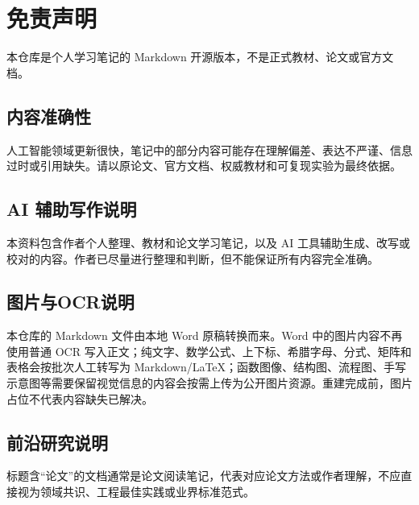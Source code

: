 \hypertarget{ux514dux8d23ux58f0ux660e}{%
\chapter{免责声明}\label{ux514dux8d23ux58f0ux660e}}

本仓库是个人学习笔记的 Markdown 开源版本，不是正式教材、论文或官方文档。

\hypertarget{ux5185ux5bb9ux51c6ux786eux6027}{%
\section{内容准确性}\label{ux5185ux5bb9ux51c6ux786eux6027}}

人工智能领域更新很快，笔记中的部分内容可能存在理解偏差、表达不严谨、信息过时或引用缺失。请以原论文、官方文档、权威教材和可复现实验为最终依据。

\hypertarget{ai-ux8f85ux52a9ux5199ux4f5cux8bf4ux660e}{%
\section{AI 辅助写作说明}\label{ai-ux8f85ux52a9ux5199ux4f5cux8bf4ux660e}}

本资料包含作者个人整理、教材和论文学习笔记，以及 AI 工具辅助生成、改写或校对的内容。作者已尽量进行整理和判断，但不能保证所有内容完全准确。

\hypertarget{ux56feux7247ux4e0eocrux8bf4ux660e-1}{%
\section{图片与OCR说明}\label{ux56feux7247ux4e0eocrux8bf4ux660e-1}}

本仓库的 Markdown 文件由本地 Word 原稿转换而来。Word 中的图片内容不再使用普通 OCR 写入正文；纯文字、数学公式、上下标、希腊字母、分式、矩阵和表格会按批次人工转写为 Markdown/LaTeX；函数图像、结构图、流程图、手写示意图等需要保留视觉信息的内容会按需上传为公开图片资源。重建完成前，图片占位不代表内容缺失已解决。

\hypertarget{ux524dux6cbfux7814ux7a76ux8bf4ux660e}{%
\section{前沿研究说明}\label{ux524dux6cbfux7814ux7a76ux8bf4ux660e}}

标题含``论文''的文档通常是论文阅读笔记，代表对应论文方法或作者理解，不应直接视为领域共识、工程最佳实践或业界标准范式。

\clearpage
